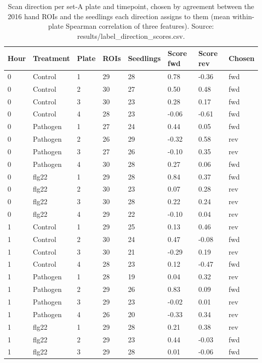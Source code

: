 \begin{table}[ht]\centering\small\setlength{\tabcolsep}{4pt}
\caption{Scan direction per set-A plate and timepoint, chosen by agreement between the 2016 hand ROIs and the seedlings each direction assigns to them (mean within-plate Spearman correlation of three features). Source: results/label\_direction\_scores.csv.}\label{tab:labels}
\begin{tabular}{llllllll}
\toprule
Hour & Treatment & Plate & ROIs & Seedlings & Score fwd & Score rev & Chosen \\
\midrule
0 & Control & 1 & 29 & 28 & 0.78 & -0.36 & fwd \\
0 & Control & 2 & 30 & 27 & 0.50 & 0.48 & fwd \\
0 & Control & 3 & 30 & 23 & 0.28 & 0.17 & fwd \\
0 & Control & 4 & 28 & 23 & -0.06 & -0.61 & fwd \\
0 & Pathogen & 1 & 27 & 24 & 0.44 & 0.05 & fwd \\
0 & Pathogen & 2 & 26 & 29 & -0.32 & 0.58 & rev \\
0 & Pathogen & 3 & 27 & 26 & -0.10 & 0.35 & rev \\
0 & Pathogen & 4 & 30 & 28 & 0.27 & 0.06 & fwd \\
0 & flg22 & 1 & 29 & 28 & 0.84 & 0.37 & fwd \\
0 & flg22 & 2 & 30 & 23 & 0.07 & 0.28 & rev \\
0 & flg22 & 3 & 30 & 28 & 0.22 & 0.24 & rev \\
0 & flg22 & 4 & 29 & 22 & -0.10 & 0.04 & rev \\
1 & Control & 1 & 29 & 25 & 0.13 & 0.46 & rev \\
1 & Control & 2 & 30 & 24 & 0.47 & -0.08 & fwd \\
1 & Control & 3 & 30 & 21 & -0.29 & 0.19 & rev \\
1 & Control & 4 & 28 & 23 & 0.12 & -0.47 & fwd \\
1 & Pathogen & 1 & 28 & 19 & 0.04 & 0.32 & rev \\
1 & Pathogen & 2 & 29 & 26 & 0.83 & 0.09 & fwd \\
1 & Pathogen & 3 & 29 & 23 & -0.02 & 0.01 & rev \\
1 & Pathogen & 4 & 26 & 20 & -0.33 & 0.34 & rev \\
1 & flg22 & 1 & 29 & 28 & 0.21 & 0.38 & rev \\
1 & flg22 & 2 & 29 & 23 & 0.44 & -0.03 & fwd \\
1 & flg22 & 3 & 29 & 28 & 0.01 & -0.06 & fwd \\

\end{tabular}
\end{table}
